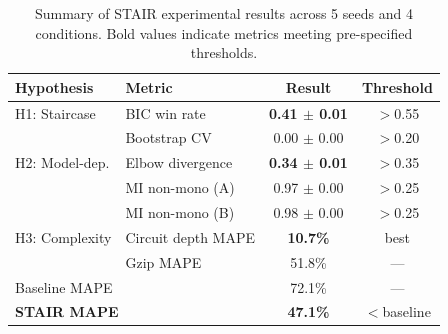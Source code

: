 \begin{table}[t]
\centering
\caption{Summary of STAIR experimental results across 5 seeds and 4 conditions. Bold values indicate metrics meeting pre-specified thresholds.}
\label{tab:main_results}
\begin{tabular}{llcc}
\toprule
\textbf{Hypothesis} & \textbf{Metric} & \textbf{Result} & \textbf{Threshold} \\
\midrule
H1: Staircase & BIC win rate & \textbf{0.41 $\pm$ 0.01} & $>$0.55 \\
              & Bootstrap CV & 0.00 $\pm$ 0.00 & $>$0.20 \\
\midrule
H2: Model-dep. & Elbow divergence & \textbf{0.34 $\pm$ 0.01} & $>$0.35 \\
               & MI non-mono (A) & 0.97 $\pm$ 0.00 & $>$0.25 \\
               & MI non-mono (B) & 0.98 $\pm$ 0.00 & $>$0.25 \\
\midrule
H3: Complexity & Circuit depth MAPE & \textbf{10.7\%} & best \\
               & Gzip MAPE & 51.8\% & --- \\
\midrule
\multicolumn{2}{l}{Baseline MAPE} & 72.1\% & --- \\
\multicolumn{2}{l}{\textbf{STAIR MAPE}} & \textbf{47.1\%} & $<$baseline \\
\bottomrule
\end{tabular}
\end{table}

